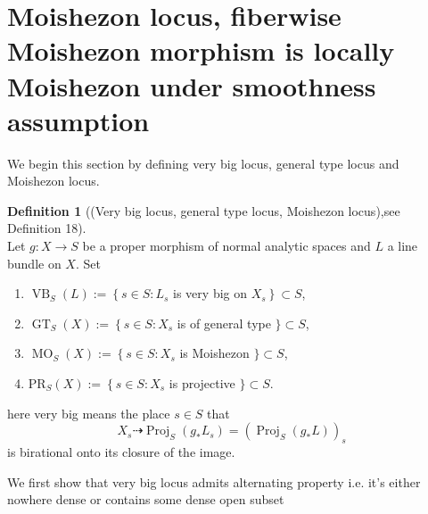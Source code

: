 \documentclass[11pt]{article}
\theoremstyle{definition}
\newtheorem{definition}[theorem]{Definition}
\begin{document}
	
	\section{Moishezon locus, fiberwise Moishezon morphism is locally Moishezon under smoothness assumption}
	
	We begin this section by defining very big locus, general type locus and Moishezon locus. 
	\begin{definition}[(Very big locus, general type locus, Moishezon locus),see \cite{Moishezonmorphism} Definition 18]~\\
	Let $g: X \rightarrow S$ be a proper morphism of normal analytic spaces and $L$ a line bundle on $X$. Set
	\begin{enumerate}
		\item  $\operatorname{VB}_S(L):=\left\{s \in S: L_s\right.$ is very big on $\left.X_s\right\} \subset S$,
		\item $\operatorname{GT}_S(X):=\left\{s \in S: X_s\right.$ is of general type $\} \subset S$,
		\item $\operatorname{MO}_S(X):=\left\{s \in S: X_s\right.$ is Moishezon $\} \subset S$,
		\item $\mathrm{PR}_S(X):=\left\{s \in S: X_s\right.$ is projective $\} \subset S$.
	\end{enumerate}
	here very big means the place $s\in S$ that $$X_s \dashrightarrow \operatorname{Proj}_S(g_* L_s) = (\operatorname{Proj}_S(g_* L))_s$$is birational onto its closure of the image. 
	\end{definition}
	We first show that very big locus admits alternating property i.e. it's either nowhere dense or contains some dense open subset
	
\end{document}
